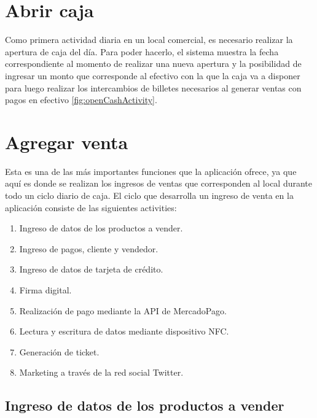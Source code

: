 
\section{Abrir caja}
\label{sec:ui.newcash}

Como primera actividad diaria en un local comercial, es necesario realizar la apertura de caja del d\'ia. Para poder hacerlo, el sistema muestra la fecha correspondiente al momento de realizar una nueva apertura y la posibilidad de ingresar un monto que corresponde al efectivo con la que la caja va a disponer para luego realizar los intercambios de billetes necesarios al generar ventas con pagos en efectivo \ref{fig:openCashActivity}.


\section{Agregar venta}
\label{sec:ui.addsale}

Esta es una de las m\'as importantes funciones que la aplicaci\'on ofrece, ya que aqu\'i es donde se realizan los ingresos de ventas que corresponden al local durante todo un ciclo diario de caja. El ciclo que desarrolla un ingreso de venta en la aplicaci\'on consiste de las siguientes activities:

\begin{enumerate}
\item Ingreso de datos de los productos a vender.
\item Ingreso de pagos, cliente y vendedor.
\item Ingreso de datos de tarjeta de cr\'edito.
\item Firma digital.
\item Realizaci\'on de pago mediante la \ac{API} de MercadoPago.
\item Lectura y escritura de datos mediante dispositivo \ac{NFC}.
\item Generaci\'on de ticket.
\item Marketing a trav\'es de la red social Twitter.
\end{enumerate}


\subsection{Ingreso de datos de los productos a vender}
\label{subsec:ui.addsale.products}

